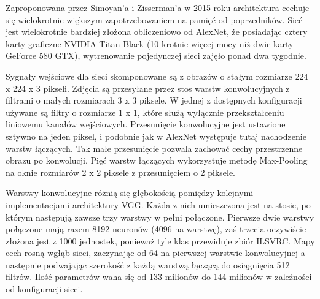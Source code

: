 \documentclass[12pt,a4paper,twoside,titlepage,openright]{book}
\begin{document}
Zaproponowana przez Simoyan'a i Zisserman'a w 2015 roku architektura cechuje się wielokrotnie większym zapotrzebowaniem na pamięć od poprzedników. %
Sieć jest wielokrotnie bardziej złożona obliczeniowo od AlexNet, że posiadając cztery karty graficzne NVIDIA Titan Black (10-krotnie więcej mocy niż dwie karty GeForce 580 GTX), wytrenowanie pojedynczej sieci zajęło ponad dwa tygodnie.

Sygnały wejściowe dla sieci skomponowane są z obrazów o stałym rozmiarze 224 x 224 x 3 pikseli. Zdjęcia są przesyłane przez stos warstw konwolucyjnych z filtrami o małych rozmiarach 3 x 3 piksele. W jednej z dostępnych konfiguracji używane są filtry o rozmiarze 1 x 1, które służą wyłącznie przekształceniu liniowemu kanałów wejściowych. Przesunięcie konwolucyjne jest ustawione sztywno na jeden piksel, i podobnie jak w AlexNet występuje tutaj nachodzenie warstw łączących. Tak małe przesunięcie pozwala zachować cechy przestrzenne obrazu po konwolucji. Pięć warstw łączących wykorzystuje metodę Max-Pooling na oknie rozmiarów 2 x 2 piksele z przesunięciem o 2 piksele.

Warstwy konwolucyjne różnią się głębokością pomiędzy kolejnymi implementacjami architektury VGG. Każda z nich umieszczona jest na stosie, po którym następują zawsze trzy warstwy w pełni połączone. Pierwsze dwie warstwy połączone mają razem 8192 neuronów (4096 na warstwę), zaś trzecia oczywiście złożona jest z 1000 jednostek, ponieważ tyle klas przewiduje zbiór ILSVRC. Mapy cech rosną wgłąb sieci, zaczynając od 64 na pierwszej warstwie konwolucyjnej a następnie podwajając szerokość z każdą warstwą łączącą do osiągnięcia 512 filtrów. Ilość parametrów waha się od 133 milionów do 144 milionów w zależności od konfiguracji sieci.
\end{document}
